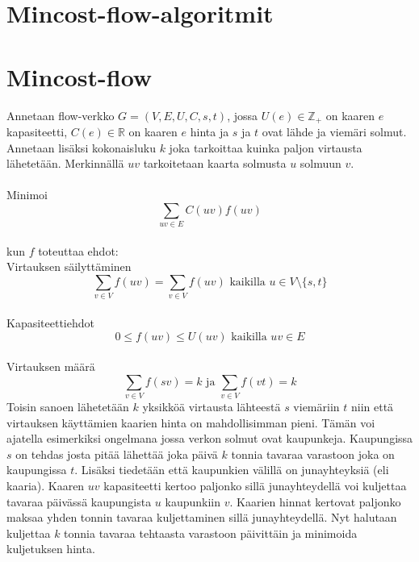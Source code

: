 \documentclass[a4paper, 11pt]{article}
\begin{document}
\noindent

\section*{Mincost-flow-algoritmit}

\section*{Mincost-flow}
Annetaan flow-verkko $G = (V, E, U, C, s, t)$, jossa $U(e) \in \mathbb{Z_+}$ on kaaren $e$ kapasiteetti, $C(e) \in \mathbb{R}$ on kaaren $e$ hinta ja $s$ ja $t$ ovat lähde ja viemäri solmut. Annetaan lisäksi kokonaisluku $k$ joka tarkoittaa kuinka paljon virtausta lähetetään. Merkinnällä $uv$ tarkoitetaan kaarta solmusta $u$ solmuun $v$.\\\\ Minimoi $$\sum_{uv \in E} C(uv) f(uv)$$\\
kun $f$ toteuttaa ehdot:\\ Virtauksen säilyttäminen $$\sum_{v \in V} f(uv) = \sum_{v \in V} f(uv) \text{ kaikilla } u \in V \setminus \{s, t\}$$
\\Kapasiteettiehdot
$$0 \le f(uv) \le U(uv) \text{ kaikilla } uv \in E$$
\\Virtauksen määrä
$$\sum_{v \in V} f(sv) = k \text{ ja } \sum_{v \in V} f(vt) = k$$
Toisin sanoen lähetetään $k$ yksikköä virtausta lähteestä $s$ viemäriin $t$ niin että virtauksen käyttämien kaarien hinta on mahdollisimman pieni. Tämän voi ajatella esimerkiksi ongelmana jossa verkon solmut ovat kaupunkeja. Kaupungissa $s$ on tehdas josta pitää lähettää joka päivä $k$ tonnia tavaraa varastoon joka on kaupungissa $t$. Lisäksi tiedetään että kaupunkien välillä on junayhteyksiä (eli kaaria). Kaaren $uv$ kapasiteetti kertoo paljonko sillä junayhteydellä voi kuljettaa tavaraa päivässä kaupungista $u$ kaupunkiin $v$. Kaarien hinnat kertovat paljonko maksaa yhden tonnin tavaraa kuljettaminen sillä junayhteydellä. Nyt halutaan kuljettaa $k$ tonnia tavaraa tehtaasta varastoon päivittäin ja minimoida  kuljetuksen hinta.
\end{document}
